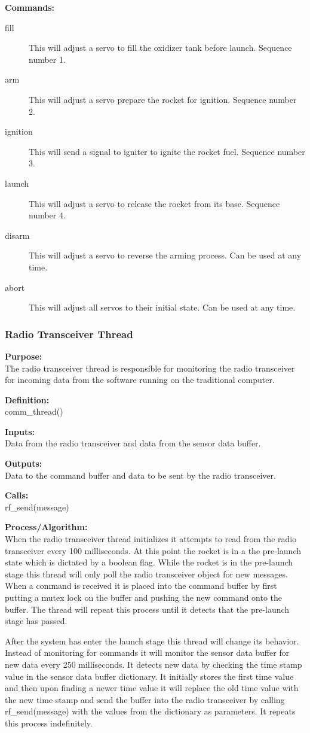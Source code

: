 \documentclass[10pt,draftclsnofoot,onecolumn,compsoc]{IEEEtran}
\begin{document}
{\bf Commands:} \\
\begin{description}
	\item[fill] This will adjust a servo to fill the oxidizer tank before launch. Sequence number 1.
	\item[arm] This will adjust a servo prepare the rocket for ignition. Sequence number 2.
	\item[ignition] This will send a signal to igniter to ignite the rocket fuel. Sequence number 3.
	\item[launch] This will adjust a servo to release the rocket from its base. Sequence number 4.
	\item[disarm] This will adjust a servo to reverse the arming process. Can be used at any time.
	\item[abort] This will adjust all servos to their initial state. Can be used at any time.
\end{description}
\subsubsection{Radio Transceiver Thread}
{\bf Purpose:} \\
The radio transceiver thread is responsible for monitoring the radio transceiver for incoming data from the software running on the traditional computer. \par
{\bf Definition:} \\ 
comm\_thread() \par
{\bf Inputs:} \\  Data from the radio transceiver and data from the sensor data buffer. \par
{\bf Outputs:} \\ Data to the command buffer and data to be sent by the radio transceiver. \par
{\bf Calls:} \\ rf\_send(message) \par
{\bf Process/Algorithm:} \\
When the radio transceiver thread initializes it attempts to read from the radio transceiver every 100 milliseconds. At this point the rocket is in a the pre-launch state which is dictated by a boolean flag. While the rocket is in the pre-launch stage this thread will only poll the radio transceiver object for new messages. When a command is received it is placed into the command buffer by first putting a mutex lock on the buffer and pushing the new command onto the buffer. The thread will repeat this process until it detects that the pre-launch stage has passed.  \par
After the system has enter the launch stage this thread will change its behavior. Instead of monitoring for commands it will monitor the sensor data buffer for new data every 250 milliseconds. It detects new data by checking the time stamp value in the sensor data buffer dictionary. It initially stores the first time value and then upon finding a newer time value it will replace the old time value with the new time stamp and send the buffer into the radio transceiver by calling rf\_send(message) with the values from the dictionary as parameters. It repeats this process indefinitely. \par
\end{document}
